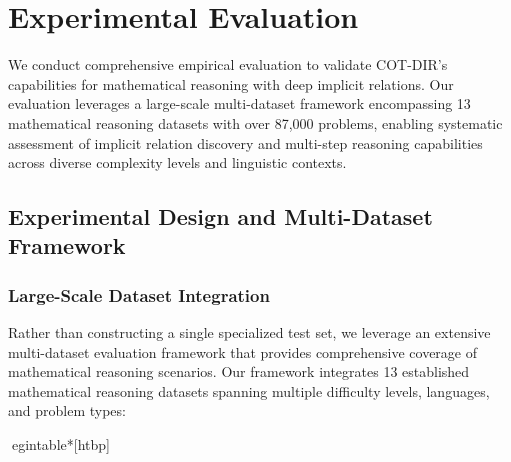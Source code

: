 \section{Experimental Evaluation}
\label{sec:experiments}

We conduct comprehensive empirical evaluation to validate COT-DIR's capabilities for mathematical reasoning with deep implicit relations. Our evaluation leverages a large-scale multi-dataset framework encompassing 13 mathematical reasoning datasets with over 87,000 problems, enabling systematic assessment of implicit relation discovery and multi-step reasoning capabilities across diverse complexity levels and linguistic contexts.

\subsection{Experimental Design and Multi-Dataset Framework}

\subsubsection{Large-Scale Dataset Integration}

Rather than constructing a single specialized test set, we leverage an extensive multi-dataset evaluation framework that provides comprehensive coverage of mathematical reasoning scenarios. Our framework integrates 13 established mathematical reasoning datasets spanning multiple difficulty levels, languages, and problem types:

egin{table*}[htbp]
